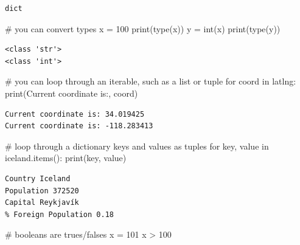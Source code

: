 \documentclass[
  letterpaper,
  DIV=11,
  numbers=noendperiod]{scrreprt}
\newenvironment{Shaded}{\begin{snugshade}}{\end{snugshade}}
\newcommand{\BuiltInTok}[1]{\textcolor[rgb]{0.00,0.23,0.31}{#1}}
\newcommand{\CommentTok}[1]{\textcolor[rgb]{0.37,0.37,0.37}{#1}}
\newcommand{\ControlFlowTok}[1]{\textcolor[rgb]{0.00,0.23,0.31}{#1}}
\newcommand{\DecValTok}[1]{\textcolor[rgb]{0.68,0.00,0.00}{#1}}
\newcommand{\KeywordTok}[1]{\textcolor[rgb]{0.00,0.23,0.31}{#1}}
\newcommand{\NormalTok}[1]{\textcolor[rgb]{0.00,0.23,0.31}{#1}}
\newcommand{\OperatorTok}[1]{\textcolor[rgb]{0.37,0.37,0.37}{#1}}
\newcommand{\StringTok}[1]{\textcolor[rgb]{0.13,0.47,0.30}{#1}}
\begin{document}
\begin{verbatim}
dict
\end{verbatim}

\begin{Shaded}
\begin{Highlighting}[]
\CommentTok{\# you can convert types}
\NormalTok{x }\OperatorTok{=} \StringTok{\textquotesingle{}100\textquotesingle{}}
\BuiltInTok{print}\NormalTok{(}\BuiltInTok{type}\NormalTok{(x))}
\NormalTok{y }\OperatorTok{=} \BuiltInTok{int}\NormalTok{(x)}
\BuiltInTok{print}\NormalTok{(}\BuiltInTok{type}\NormalTok{(y))}
\end{Highlighting}
\end{Shaded}

\begin{verbatim}
<class 'str'>
<class 'int'>
\end{verbatim}

\begin{Shaded}
\begin{Highlighting}[]
\CommentTok{\# you can loop through an iterable, such as a list or tuple}
\ControlFlowTok{for}\NormalTok{ coord }\KeywordTok{in}\NormalTok{ latlng:}
    \BuiltInTok{print}\NormalTok{(}\StringTok{\textquotesingle{}Current coordinate is:\textquotesingle{}}\NormalTok{, coord)}
\end{Highlighting}
\end{Shaded}

\begin{verbatim}
Current coordinate is: 34.019425
Current coordinate is: -118.283413
\end{verbatim}

\begin{Shaded}
\begin{Highlighting}[]
\CommentTok{\# loop through a dictionary keys and values as tuples}
\ControlFlowTok{for}\NormalTok{ key, value }\KeywordTok{in}\NormalTok{ iceland.items():}
    \BuiltInTok{print}\NormalTok{(key, value)}
\end{Highlighting}
\end{Shaded}

\begin{verbatim}
Country Iceland
Population 372520
Capital Reykjavík
% Foreign Population 0.18
\end{verbatim}

\begin{Shaded}
\begin{Highlighting}[]
\CommentTok{\# booleans are trues/falses}
\NormalTok{x }\OperatorTok{=} \DecValTok{101}
\NormalTok{x }\OperatorTok{\textgreater{}} \DecValTok{100}
\end{Highlighting}
\end{Shaded}
\end{document}
